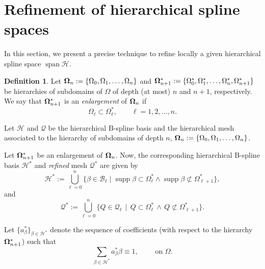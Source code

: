 \documentclass[12pt,a4paper,pdftex]{article}
\theoremstyle{plain}
\theoremstyle{definition}
\newtheorem{definition}[theorem]{Definition}
\theoremstyle{remark}
\DeclareMathOperator{\supp}{supp}
\DeclareMathOperator{\Span}{span}
\newcommand\BB{\mathcal B}
\newcommand\QQ{\mathcal Q}
\newcommand\HH{\mathcal H}
\begin{document}
\section{Refinement of hierarchical spline spaces}\label{S:refinement}

In this section, we present a precise technique to refine locally a given hierarchical spline space $\Span\HH$.


\begin{definition}
 Let ${\bf\Omega}_n := \{\Omega_0,\Omega_1,\dots,\Omega_n\}$ and ${\bf\Omega}_{n+1}^*:= \{\Omega_0^*,\Omega_1^*,\dots,\Omega_n^*,\Omega_{n+1}^*\}$ be hierarchies of subdomains of $\Omega$ of depth (at most) $n$ and $n+1$, respectively. We say that ${\bf\Omega}_{n+1}^*$ is an \emph{enlargement} of ${\bf\Omega}_n$ if
 $$\Omega_\ell\subset\Omega_\ell^*,\qquad \ell=1,2,\dots,n.$$ 
 \end{definition}

 Let $\HH$ and $\QQ$ be the hierarchical B-spline basis and the hierarchical mesh associated to the hierarchy of 
subdomains of depth $n$,
${\bf\Omega}_n := \{\Omega_0,\Omega_1,\dots,\Omega_n\}$.
 
Let ${\bf\Omega}_{n+1}^*$ be an enlargement of ${\bf\Omega}_n$. Now, the corresponding hierarchical B-spline basis ${\HH}^*$ and 
\emph{refined} 
mesh $\QQ^*$ are given by 
\begin{equation}
{\HH}^*:= \bigcup_{\ell = 0}^{n} \{\beta \in \BB_\ell \mid \supp \beta 
\subset \Omega_\ell^* \wedge  \supp \beta \not\subset \Omega_{\ell+1}^*\},
\end{equation}
and
$$\QQ^*:= \bigcup_{\ell = 0}^{n} \{ Q\in\QQ_\ell \,\mid\, Q\subset \Omega_\ell^* 
\,\wedge\, Q\not\subset \Omega_{\ell+1}^*\}.$$



Let $\{a_\beta^*\}_{\beta\in{\HH}^*}$ denote the sequence of coefficients (with respect to the hierarchy ${\bf\Omega}_{n+1}^*$) such that $$\sum_{\beta\in{\HH}^*} a_\beta^*\beta \equiv 1,\qquad\text{ on }\Omega.$$ 
\end{document}

